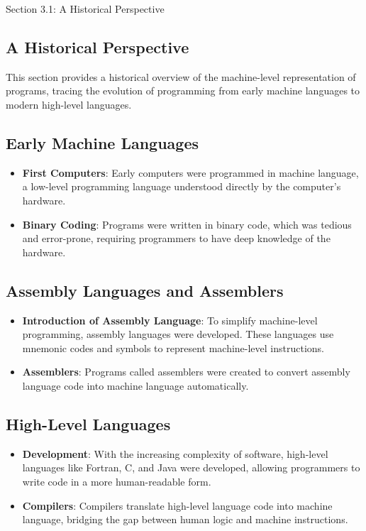 \begin{notes}{Section 3.1: A Historical Perspective}
    \subsection*{A Historical Perspective}

    This section provides a historical overview of the machine-level representation of programs, tracing the evolution of programming from early machine languages to modern high-level languages.
    
    \subsection*{Early Machine Languages}
    
    \begin{itemize}
        \item \textbf{First Computers}: Early computers were programmed in machine language, a low-level programming language understood directly by the computer's hardware.
        \item \textbf{Binary Coding}: Programs were written in binary code, which was tedious and error-prone, requiring programmers to have deep knowledge of the hardware.
    \end{itemize}
    
    \subsection*{Assembly Languages and Assemblers}
    
    \begin{itemize}
        \item \textbf{Introduction of Assembly Language}: To simplify machine-level programming, assembly languages were developed. These languages use mnemonic codes and symbols to represent machine-level 
        instructions.
        \item \textbf{Assemblers}: Programs called assemblers were created to convert assembly language code into machine language automatically.
    \end{itemize}
    
    \subsection*{High-Level Languages}
    
    \begin{itemize}
        \item \textbf{Development}: With the increasing complexity of software, high-level languages like Fortran, C, and Java were developed, allowing programmers to write code in a more human-readable form.
        \item \textbf{Compilers}: Compilers translate high-level language code into machine language, bridging the gap between human logic and machine instructions.
    \end{itemize}
    

\end{notes}

